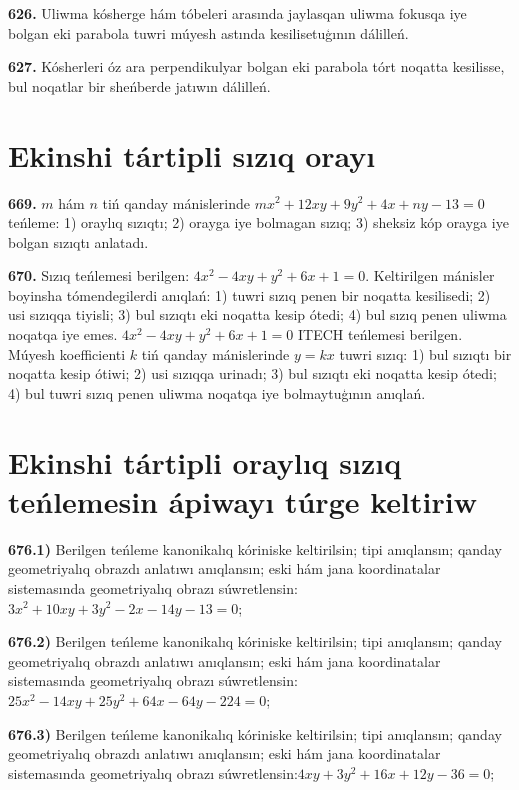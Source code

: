 \textbf {626.} Uliwma kósherge hám tóbeleri arasında jaylasqan uliwma fokusqa iye bolgan eki parabola tuwri múyesh astında kesilisetuģının dálilleń.

\textbf{627.} Kósherleri óz ara perpendikulyar bolgan eki parabola tórt noqatta kesilisse, bul noqatlar bir sheńberde jatıwın dálilleń.



\section{ Ekinshi tártipli sızıq orayı }

\textbf{669.} $m$ hám $n$ tiń qanday mánislerinde $m x^2+12 x y+9 y^2+4 x+n y-13=0$ teńleme: 1) oraylıq sızıqtı; 2) orayga iye bolmagan sızıq; 3) sheksiz kóp orayga iye bolgan sızıqtı anlatadı.

\textbf {670.} Sızıq teńlemesi berilgen: $4 x^2-4 x y+y^2+6 x+1=0$. Keltirilgen mánisler boyinsha tómendegilerdi anıqlań: 1) tuwri sızıq penen bir noqatta kesilisedi; 2) usi sızıqqa tiyisli; 3) bul sızıqtı eki noqatta kesip ótedi; 4) bul sızıq penen uliwma noqatqa iye emes.
$4 x^2-4 x y+y^2+6 x+1=0$ ITECH teńlemesi berilgen. Múyesh koefficienti $k$ tiń qanday mánislerinde $y=kx$ tuwri sızıq: 1) bul sızıqtı bir noqatta kesip ótiwi; 2) usi sızıqqa urinadı; 3) bul sızıqtı eki noqatta kesip ótedi; 4) bul tuwri sızıq penen uliwma noqatqa iye bolmaytuģının anıqlań.



\section{Ekinshi tártipli oraylıq sızıq teńlemesin ápiwayı túrge keltiriw}


\textbf{676.1)} Berilgen teńleme kanonikalıq kóriniske keltirilsin; tipi anıqlansın; qanday geometriyalıq obrazdı anlatıwı anıqlansın; eski hám jana koordinatalar sistemasında geometriyalıq obrazı súwretlensin:$3 x^2+10 x y+3 y^2-2 x-14 y-13=0$;

\textbf{676.2)} Berilgen teńleme kanonikalıq kóriniske keltirilsin; tipi anıqlansın; qanday geometriyalıq obrazdı anlatıwı anıqlansın; eski hám jana koordinatalar sistemasında geometriyalıq obrazı súwretlensin:$25 x^2-14 x y+25 y^2+64 x-64 y-224=0$;

\textbf{676.3)} Berilgen teńleme kanonikalıq kóriniske keltirilsin; tipi anıqlansın; qanday geometriyalıq obrazdı anlatıwı anıqlansın; eski hám jana koordinatalar sistemasında geometriyalıq obrazı súwretlensin:$4 x y+3 y^2+16 x+12 y-36=0$;

